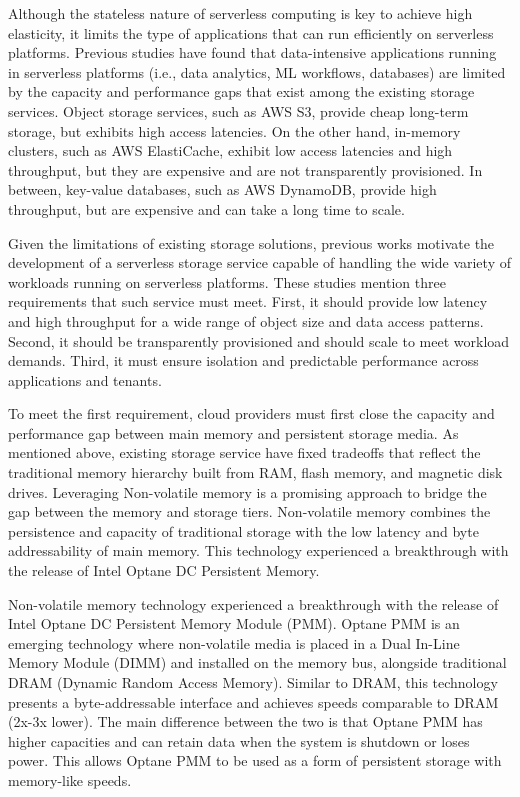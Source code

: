 Although the stateless nature of serverless computing is key to achieve high elasticity, it limits the type of applications that can run efficiently on serverless platforms. Previous studies \cite{jonas2019cloud} have found that data-intensive applications running in serverless platforms (i.e., data analytics, ML workflows, databases) are limited by the capacity and performance gaps that exist among the existing storage services. Object storage services, such as AWS S3, provide cheap long-term storage, but exhibits high access latencies. On the other hand, in-memory clusters, such as AWS ElastiCache, exhibit low access latencies and high throughput, but they are expensive and are not transparently provisioned. In between, key-value databases, such as AWS DynamoDB, provide high throughput, but are expensive and can take a long time to scale.

Given the limitations of existing storage solutions, previous works motivate the development of a serverless storage service capable of handling the wide variety of workloads running on serverless platforms. These studies mention three requirements that such service must meet. First, it should provide low latency and high throughput for a wide range of object size and data access patterns. Second, it should be transparently provisioned and should scale to meet workload demands. Third, it must ensure isolation and predictable performance across applications and tenants.

To meet the first requirement, cloud providers must first close the capacity and performance gap between main memory and persistent storage media. As mentioned above, existing storage service have fixed tradeoffs that reflect the traditional memory hierarchy built from RAM, flash memory, and magnetic disk drives. Leveraging Non-volatile memory is a promising approach to bridge the gap between the memory and storage tiers. Non-volatile memory combines the persistence and capacity of traditional storage with the low latency and byte addressability of main memory. This technology experienced a breakthrough with the release of Intel Optane DC Persistent Memory.

Non-volatile memory technology experienced a breakthrough with the release of Intel Optane DC Persistent Memory Module (PMM). Optane PMM is an emerging technology where non-volatile media is placed in a Dual In-Line Memory Module (DIMM) and installed on the memory bus, alongside traditional DRAM (Dynamic Random Access Memory). Similar to DRAM, this technology presents a byte-addressable interface and achieves speeds comparable to DRAM (2x-3x lower). The main difference between the two is that Optane PMM has higher capacities and can retain data when the system is shutdown or loses power. This allows Optane PMM to be used as a form of persistent storage with memory-like speeds.

